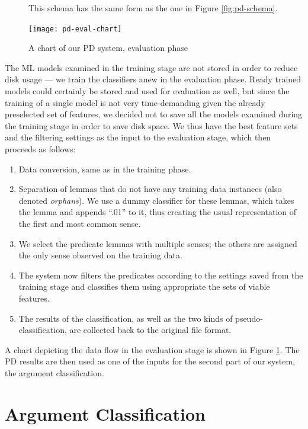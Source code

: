 \documentclass[12pt,notitlepage]{report}
\begin{document}
\begin{figure}[htb]
\caption{A chart of our PD system, evaluation phase}\label{fig:pd-eval}
\noindent\footnotesize This schema has the same form as the one in Figure \ref{fig:pd-schema}.
\begin{center}
\texttt{[image: pd-eval-chart]}
\end{center}
\end{figure}

The ML models examined in the training stage are not stored in order to reduce disk usage --- we train the classifiers anew in the evaluation phase. Ready trained models could certainly be stored and used for evaluation as well, but since the training of a single model is not very time-demanding given the already preselected set of features, we decided not to save all the models examined during the training stage in order to save disk space. We thus have the best feature sets and the filtering settings as the input to the evaluation stage, which then proceeds as follows:
\begin{enumerate}
    \item Data conversion, same as in the training phase.
    \item Separation of lemmas that do not have any training data instances (also denoted \emph{orphans}). We use a dummy classifier for these lemmas, which takes the lemma and appends ``.01'' to it, thus creating the usual representation of the first and most common sense.
    \item We select the predicate lemmas with multiple senses; the others are assigned the only sense observed on the training data.
    \item The system now filters the predicates according to the settings saved from the training stage and classifies them using appropriate the sets of viable features.
    \item The results of the classification, as well as the two kinds of pseudo-classification, are collected back to the original file format.
\end{enumerate}
A chart depicting the data flow in the evaluation stage is shown in Figure \ref{fig:pd-eval}. The PD results are then used as one of the inputs for the second part of our system, the argument classification.

%
%
\chapter{Argument Classification}\label{ac}
%
%
\end{document}

